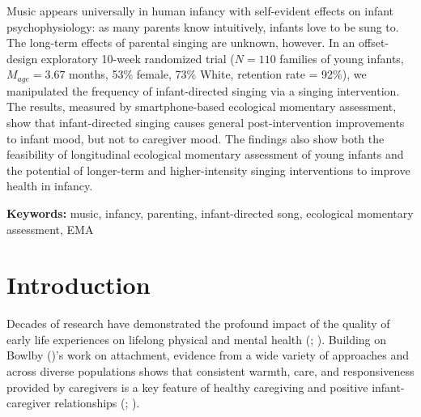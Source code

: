 \documentclass[
]{article}
\begin{document}
\normalsize
\begin{mdframed}[backgroundcolor=gray!20]
Music appears universally in human infancy with self-evident effects on infant psychophysiology: as many parents know intuitively, infants love to be sung to. The long-term effects of parental singing are unknown, however. In an offset-design exploratory 10-week randomized trial ($N = 110$ families of young infants, $M_{age} = 3.67$ months, 53\% female, 73\% White, retention rate = 92\%), we manipulated the frequency of infant-directed singing via a singing intervention. The results, measured by smartphone-based ecological momentary assessment, show that infant-directed singing causes general post-intervention improvements to infant mood, but not to caregiver mood. The findings also show both the feasibility of longitudinal ecological momentary assessment of young infants and the potential of longer-term and higher-intensity singing interventions to improve health in infancy.

\textbf{Keywords:} music, infancy, parenting, infant-directed song, ecological momentary assessment, EMA
\end{mdframed}

\linenumbers
\bigskip

\section{Introduction}\label{introduction}

Decades of research have demonstrated the profound impact of the quality
of early life experiences on lifelong physical and mental health
(;
). Building on Bowlby
()'s work on attachment, evidence from a
wide variety of approaches and across diverse populations shows that
consistent warmth, care, and responsiveness provided by caregivers is a
key feature of healthy caregiving and positive infant-caregiver
relationships (;
).
\end{document}
